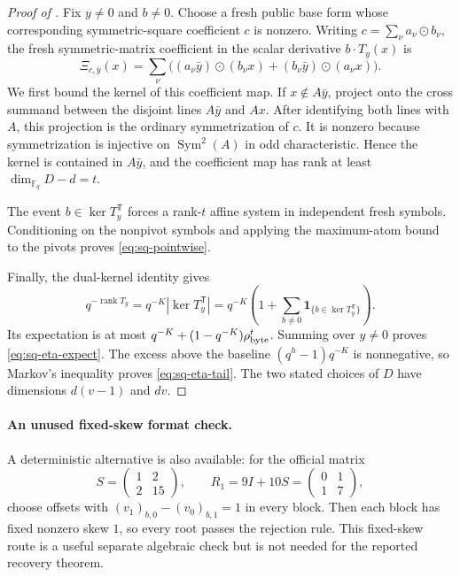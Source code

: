 \documentclass[11pt]{article}
\newcommand{\F}{\mathbb F}
\newcommand{\rank}{\operatorname{rank}}
\begin{document}
\begin{proof}[Proof of ]
Fix $y\ne0$ and $b\ne0$.  Choose a fresh public base form whose corresponding
symmetric-square coefficient $c$ is nonzero.  Writing
$c=\sum_\nu a_\nu\odot b_\nu$, the fresh symmetric-matrix coefficient in the
scalar derivative $b\cdot T_y(x)$ is
\[
 \Xi_{c,\bar y}(x)=
 \sum_\nu\bigl((a_\nu\bar y)\odot(b_\nu x)
 +(b_\nu\bar y)\odot(a_\nu x)\bigr).
\]
We first bound the kernel of this coefficient map.  If $x\notin A\bar y$,
project onto the cross summand between the disjoint lines $A\bar y$ and $Ax$.
After identifying both lines with $A$, this projection is the ordinary
symmetrization of $c$.  It is nonzero because symmetrization is injective on
$\operatorname{Sym}^2(A)$ in odd characteristic.  Hence the kernel is
contained in $A\bar y$, and the coefficient map has rank at least
$\dim_{\F_q}D-d=t$.

The event $b\in\ker T_y^{\mathsf T}$ forces a rank-$t$ affine system in
independent fresh symbols.  Conditioning on the nonpivot symbols and applying
the maximum-atom bound to the pivots proves \eqref{eq:sq-pointwise}.

Finally, the dual-kernel identity gives
\[
 q^{-\rank T_y}
 =q^{-K}|\ker T_y^{\mathsf T}|
 =q^{-K}\left(1+\sum_{b\ne0}
   \mathbf1_{\{b\in\ker T_y^{\mathsf T}\}}\right).
\]
Its expectation is at most
$q^{-K}+(1-q^{-K})\rho_{\rm byte}^t$.  Summing over $y\ne0$ proves
\eqref{eq:sq-eta-expect}.  The excess above the baseline
$(q^h-1)q^{-K}$ is nonnegative, so Markov's inequality proves
\eqref{eq:sq-eta-tail}.  The two stated choices of $D$ have dimensions
$d(v-1)$ and $dv$.
\end{proof}

\paragraph{An unused fixed-skew format check.}
A deterministic alternative is also available:
for the official matrix
\[
 S=\begin{pmatrix}1&2\\2&15\end{pmatrix},
 \qquad
 R_1=9I+10S=\begin{pmatrix}0&1\\1&7\end{pmatrix},
\]
choose offsets with $(v_1)_{b,0}-(v_0)_{b,1}=1$ in every block.  Then each
block has fixed nonzero skew $1$, so every root passes the rejection rule.
This fixed-skew route is a useful separate algebraic check but is not needed
for the reported recovery theorem.
\end{document}
